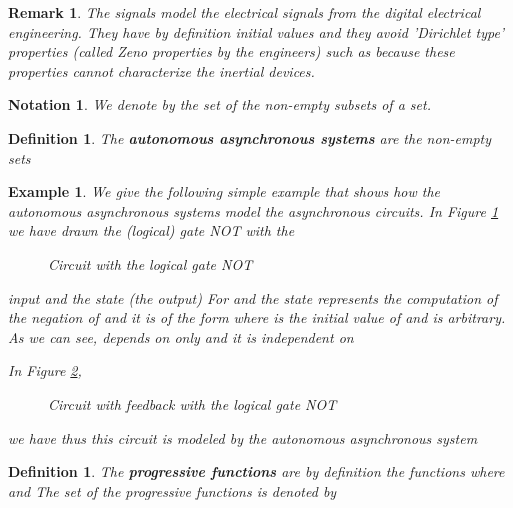 \documentclass[12pt]{article}\usepackage{amsmath}
\newtheorem{definition}[theorem]{Definition}
\newtheorem{example}[theorem]{Example}
\newtheorem{notation}[theorem]{Notation}
\newtheorem{remark}[theorem]{Remark}
\begin{document}
\begin{remark}
The signals  model the electrical signals from the digital
electrical engineering. They have by definition initial values and they avoid
'Dirichlet type' properties (called Zeno properties by the engineers) such as
because these properties cannot characterize the inertial devices.
\end{remark}

\begin{notation}
We denote by  the set of the non-empty subsets of a set.
\end{notation}

\begin{definition}
The \textbf{autonomous asynchronous systems} are the non-empty sets 
\end{definition}

\begin{example}
\label{Exa13}We give the following simple example that shows how the
autonomous asynchronous systems model the asynchronous circuits. In Figure
\ref{preliminaries1} we have drawn the (logical) gate NOT with the\begin{figure}
[ptb]
\begin{center}
\caption{Circuit with the logical gate NOT}\label{preliminaries1}\end{center}
\end{figure}
input  and the state (the output)  For
 and
the state  represents the computation of the negation of  and it is of
the form
where  is the initial value of  and  is
arbitrary. As we can see,  depends on  only and it is
independent on 

In Figure \ref{preliminaries2},\begin{figure}
[ptb]
\begin{center}
\caption{Circuit with feedback with the logical gate NOT}\label{preliminaries2}\end{center}
\end{figure}
we have
thus this circuit is modeled by the autonomous asynchronous system

\end{example}

\begin{definition}
The \textbf{progressive functions} 
are by definition the functions
where  and  The set of the progressive functions is denoted by 
\end{definition}
\end{document}
